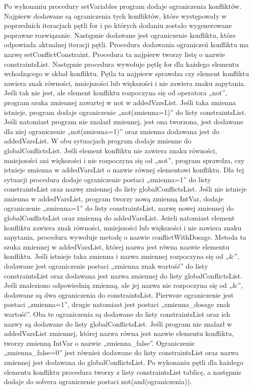 Po wykonaniu procedury setVariables program dodaje ograniczenia konfliktów. Najpierw dodawane są ograniczenia tych konfliktów, które występowały w poprzednich iteracjach pętli for i po których dodaniu zostało wygenerowane poprawne rozwiązanie. Następnie dodawane jest ograniczenie konfliktu, które odpowiada aktualnej iteracji pętli. Procedura dodawania ograniczeń konfliktu ma nazwę setConflictConstraint. Procedura ta najpierw tworzy listę o nazwie constraintsList. Następnie procedura wywołuje pętlę for dla każdego elementu wchodzącego w skład konfliktu. Pętla ta najpierw sprawdza czy element konfliktu zawiera znak równości, mniejszości lub większości i nie zawiera znaku zapytania. Jeśli tak nie jest, ale element konfliktu rozpoczyna się od operatora „not”, program szuka zmiennej zawartej w not w addedVarsList. Jeśli taka zmienna istnieje, program dodaje ograniczenie „not(zmienna=1)” do listy constraintsList. Jeśli natomiast program nie znalazł zmiennej, jest ona tworzona, jest dodawane dla niej ograniczenie „not(zmienna=1)” oraz zmienna dodawana jest do addedVarsList. W obu sytuacjach program dodaje zmienne do globalConflictsList. Jeśli element konfliktu nie zawiera znaku równości, mniejszości ani większości i nie rozpoczyna się od „not”, program sprawdza, czy istnieje zmienna w addedVarsList o nazwie równej elementowi konfliktu. Dla tej sytuacji procedura dodaje ograniczenie postaci „zmienna=1” do listy constraintsList oraz nazwę zmiennej do listy globalConflictsList. Jeśli nie istnieje zmienna w addedVarsList, program tworzy nową zmienną IntVar, dodaje ograniczenie „zmienna=1” do listy constraintsList, nazwę nowej zmiennej do globalConflictsList oraz zmienną do addedVarsList. Jeżeli natomiast element konfliktu zawiera znak równości, mniejszości lub większości i nie zawiera znaku zapytania, procedura wywołuje metodę o nazwie conflictWithDosage. Metoda ta szuka zmiennej w addedVarsList, której nazwa jest równa nazwie elementu konfliktu. Jeśli istnieje taka zmienna i nazwa zmiennej rozpoczyna się od „\&”, dodawane jest ograniczenie postaci „zmienna znak wartość” do listy constraintsList oraz dodawana jest nazwa zmiennej do listy globalConflictsList. Jeśli znaleziono odpowiednią zmienną, ale jej nazwa nie rozpoczyna się od „\&”, dodawane są dwa ograniczenia do constraintsList. Pierwsze ograniczenie jest postaci „zmienna=1”, drugie natomiast jest postaci „zmienna\_dosage znak wartość”. Oba te ograniczenia są dodawane do listy constraintsList oraz ich nazwy są dodawane do listy globalConflictsList. Jeśli program nie znalazł w addedVarsList zmiennej, której nazwa równa jest nazwie elementu konfliktu,  tworzy zmienną IntVar o nazwie „zmienna\_false”. Ograniczenie „zmienna\_false=0” jest również dodawane do listy constraintsList oraz nazwa zmiennej jest dodawana do globalConflictsList. Po wykonaniu pętli dla każdego elementu konfliktu procedura tworzy z listy constraintsList tablicę, a następnie dodaje do solvera ograniczenie postaci not(and(ograniczenia)). 

